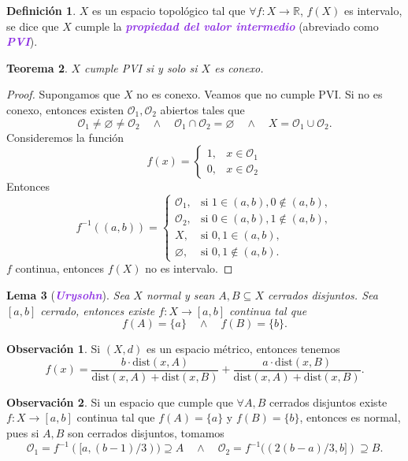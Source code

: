 \documentclass{article}
\newtheorem{theorem}{Teorema}[subsection]
\newtheorem{lemma}[theorem]{Lema}
\theoremstyle{definition}
\newtheorem{definition}[theorem]{Definición}
\newtheorem*{obs}{Observación}
\theoremstyle{remark}
\numberwithin{equation}{section}
\renewcommand{\O}{\mathcal{O}}
\newcommand{\R}{\mathbb{R}}
\newcommand{\dist}{\mathrm{dist}}
\newcommand{\wea}[1]{\textcolor{BlueViolet}{\textbf{\emph{#1}}}}
\begin{document}
\begin{definition}
  $X$ es un espacio topológico tal que $\forall f \colon X \to \R$, $f(X)$ es intervalo, se dice que $X$ cumple la \wea{propiedad del valor intermedio} (abreviado como \wea{PVI}).
\end{definition}

\begin{theorem}
  $X$ cumple PVI si y solo si $X$ es conexo.
\end{theorem}
\begin{proof}
  Supongamos que $X$ no es conexo. Veamos que no cumple PVI.
  Si no es conexo, entonces existen $\O_1,\O_2$ abiertos tales que
  \[\O_1 \neq \varnothing \neq \O_2 \quad\land\quad
  \O_1 \cap \O_2 = \varnothing \quad\land\quad
  X = \O_1 \cup \O_2.\]
  Consideremos la función
  \[f(x) = \begin{cases}
    1, &x \in \O_1 \\
    0, &x \in \O_2
  \end{cases}\]
  Entonces
  \[f^{-1}((a,b)) = \begin{cases}
    \O_1, &\text{si } 1 \in (a,b), 0 \notin (a,b), \\
    \O_2, &\text{si } 0 \in (a,b), 1 \notin (a,b), \\
    X, &\text{si } 0,1 \in (a,b), \\
    \varnothing, &\text{si } 0,1 \notin (a,b).
  \end{cases}\]
  $f$ continua, entonces $f(X)$ no es intervalo.
\end{proof}

\begin{lemma}
  [\wea{Urysohn}]
  Sea $X$ normal y sean $A,B \subseteq X$ cerrados disjuntos. Sea $[a,b]$ cerrado, entonces existe $f \colon X \to [a,b]$ continua tal que
  \[f(A) = \{a\} \quad\land\quad f(B) = \{b\}.\]
\end{lemma}

\begin{obs}
  Si $(X,d)$ es un espacio métrico, entonces tenemos
  \[f(x) = \frac{b \cdot \dist(x,A)}{\dist(x,A) + \dist(x,B)} + \frac{a \cdot \dist(x,B)}{\dist(x,A) + \dist(x,B)}.\]
\end{obs}

\begin{obs}
  Si un espacio que cumple que $\forall A,B$ cerrados disjuntos existe $f \colon X \to [a,b]$ continua tal que $f(A) = \{a\}$ y $f(B) = \{b\}$, entonces es normal, pues si $A,B$ son cerrados disjuntos, tomamos
  \[\O_1 = f^{-1}([a,(b-1)/3)) \supseteq A \quad\land\quad \O_2 = f^{-1}((2(b-a)/3, b]) \supseteq B.\]
\end{obs}
\end{document}
